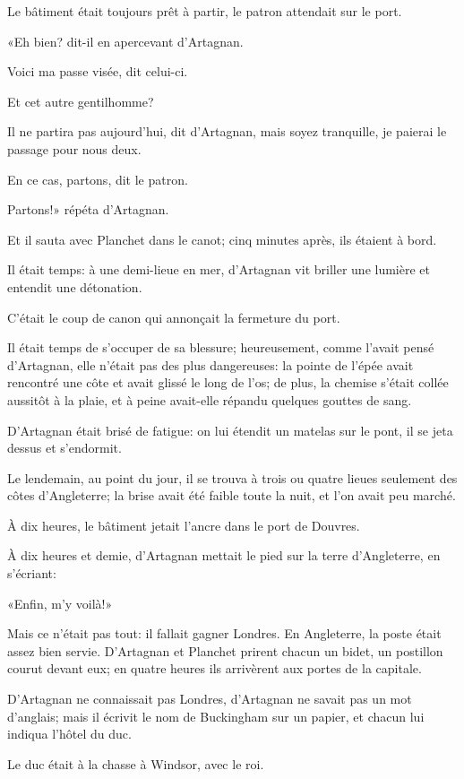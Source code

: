 Le bâtiment était toujours prêt à partir, le patron attendait sur le port. 

«Eh bien? dit-il en apercevant d'Artagnan. 

\speak  Voici ma passe visée, dit celui-ci. 

\speak  Et cet autre gentilhomme? 

\speak  Il ne partira pas aujourd'hui, dit d'Artagnan, mais soyez tranquille, je paierai le passage pour nous deux. 

\speak  En ce cas, partons, dit le patron. 

\speak  Partons!» répéta d'Artagnan. 

Et il sauta avec Planchet dans le canot; cinq minutes après, ils étaient à bord. 

Il était temps: à une demi-lieue en mer, d'Artagnan vit briller une lumière et entendit une détonation. 

C'était le coup de canon qui annonçait la fermeture du port. 

Il était temps de s'occuper de sa blessure; heureusement, comme l'avait pensé d'Artagnan, elle n'était pas des plus dangereuses: la pointe de l'épée avait rencontré une côte et avait glissé le long de l'os; de plus, la chemise s'était collée aussitôt à la plaie, et à peine avait-elle répandu quelques gouttes de sang. 

D'Artagnan était brisé de fatigue: on lui étendit un matelas sur le pont, il se jeta dessus et s'endormit. 

Le lendemain, au point du jour, il se trouva à trois ou quatre lieues seulement des côtes d'Angleterre; la brise avait été faible toute la nuit, et l'on avait peu marché. 

À dix heures, le bâtiment jetait l'ancre dans le port de Douvres. 

À dix heures et demie, d'Artagnan mettait le pied sur la terre d'Angleterre, en s'écriant: 

«Enfin, m'y voilà!» 

Mais ce n'était pas tout: il fallait gagner Londres. En Angleterre, la poste était assez bien servie. D'Artagnan et Planchet prirent chacun un bidet, un postillon courut devant eux; en quatre heures ils arrivèrent aux portes de la capitale. 

D'Artagnan ne connaissait pas Londres, d'Artagnan ne savait pas un mot d'anglais; mais il écrivit le nom de Buckingham sur un papier, et chacun lui indiqua l'hôtel du duc. 

Le duc était à la chasse à Windsor, avec le roi. 

